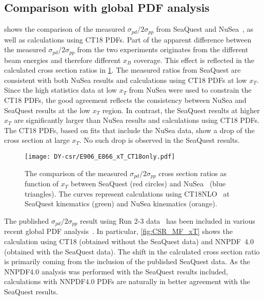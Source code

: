 \documentclass[../main.tex]{subfiles}
\begin{document}
\subsection{Comparison with global PDF analysis}
 shows the comparison of the measured $\sigma_{pd}/2\sigma_{pp}$ from SeaQuest and NuSea~\cite{towell2001},
as well as calculations using CT18 PDFs.
Part of the apparent difference between the measured $\sigma_{pd}/2\sigma_{pp}$ from the two experiments originates
from the different beam energies and therefore different $x_B$ coverage.
This effect is reflected in the calculated cross section ratios in \cref{fig:e866_e906}.
The measured ratios from SeaQuest are consistent with both NuSea results and calculations using CT18 PDFs
at low $x_T$. Since the high statistics data at low $x_T$ from NuSea were used to constrain
the CT18 PDFs, the good agreement reflects the consistency between NuSea and SeaQuest results
at the low $x_T$ region.
In contrast, the SeaQuest results at higher $x_T$ are significantly larger than NuSea results and calculations using CT18 PDFs.
The CT18 PDFs, based on fits that include the NuSea data, show a drop of the cross section
at large $x_T$. No such drop is observed in the SeaQuest results.
\begin{figure}[htpb!]
	\centering
	\texttt{[image: DY-csr/E906\_E866\_xT\_CT18only.pdf]}
	\caption{The comparison of the measured $\sigma_{pd}/2\sigma_{pp}$ cross section ratios as function of $x_T$
		between SeaQuest (red circles) and NuSea~\cite{towell2001} (blue triangles).
		The curves represent calculations using CT18NLO~\cite{hou2021} at SeaQuest kinematics (green) and NuSea kinematics (orange).}
	\label{fig:e866_e906}
\end{figure}

The published $\sigma_{pd}/2\sigma_{pp}$ result using Run 2-3 data~\cite{dove2021,dove2023}
has been included in various recent global PDF analysis~\cite{cocuzza2021,guzzi2022,accardi2023,alekhin2023}.
In particular, \cref{fig:CSR_MF_xT} shows the calculation using CT18 (obtained without the SeaQuest data)
and NNPDF~4.0 (obtained with the SeaQuest data). The shift in the calculated cross section ratio is primarily
coming from the inclusion of the published SeaQuest data.
As the NNPDF4.0 analysis was performed with the SeaQuest results included,
calculations with NNPDF4.0 PDFs are naturally in better agreement with the SeaQuest results.
\end{document}
